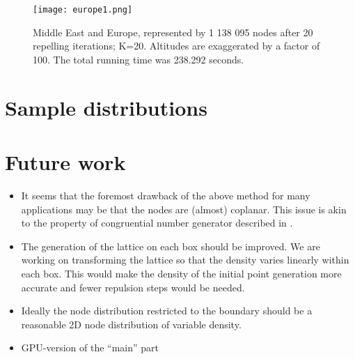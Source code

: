 \documentclass{amsart}
\theoremstyle{definition}
\begin{document}
\begin{figure}
	\centering
	\texttt{[image: europe1.png]}
	\caption{Middle East and Europe, represented by 1 138 095 nodes after 20 repelling iterations; K=20. Altitudes are exaggerated by a factor of 100. The total running time was 238.292 seconds.}
	\label{europe}
\end{figure}


\section{Sample distributions}


\section{Future work}
\begin{itemize}
	\item It seems that the foremost drawback of the above method for many applications may be that the nodes are (almost) coplanar. This issue is akin to the property of congruential number generator described in \cite{Marsaglia1968}.
	\item The generation of the lattice on each box should be improved. We are working on transforming the lattice so that the density varies linearly within each box. This would make the density of the initial point generation more accurate and fewer repulsion steps would be needed.
	\item Ideally the node distribution restricted to the boundary should be a reasonable 2D node distribution of variable density.
	\item GPU-version of the ``main'' part \cite{Recipes1989}
\end{itemize}



\end{document}
